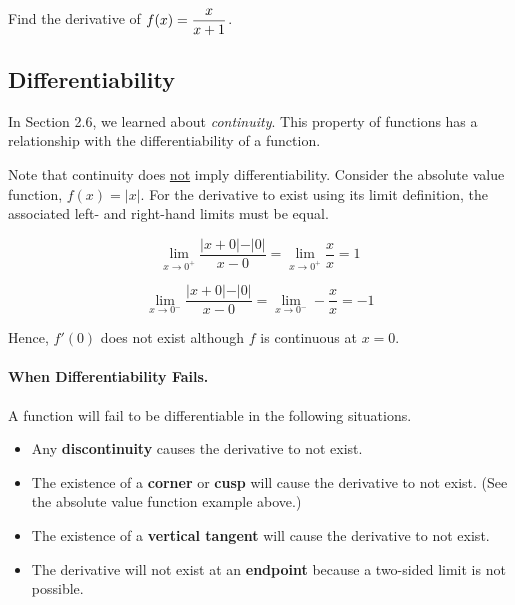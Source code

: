 \documentclass[12pt]{article}
\begin{document}
\newpage

\Example Find the derivative of $f(x)=\displaystyle\frac{x}{x+1}$.

\vspace{50mm}

\subsection*{Differentiability}

In Section 2.6, we learned about \textit{continuity}. This property of functions has a relationship with the differentiability of a function.

\vspace{5mm}


\vspace{5mm}

Note that continuity does \underline{not} imply differentiability. Consider the absolute value function, $f(x)=\vert x \vert$. For the derivative to exist using its limit definition, the associated left- and right-hand limits must be equal.

$$\lim_{x\to 0^+}\frac{\vert x+0\vert -\vert 0 \vert}{x-0}=\lim_{x\to 0^+}\frac{x}{x}=1$$

$$\lim_{x\to 0^-}\frac{\vert x+0\vert - \vert 0 \vert}{x-0}=\lim_{x\to 0^-}-\frac{x}{x}=-1$$

\vspace{3mm}

Hence, $f'(0)$ does not exist although $f$ is continuous at $x=0$.

\vspace{3mm}

\paragraph{When Differentiability Fails.} A function will fail to be differentiable in the following situations.
\begin{itemize}
	\item Any \textbf{discontinuity} causes the derivative to not exist.
	\item The existence of a \textbf{corner} or \textbf{cusp} will cause the derivative to not exist. (See the absolute value function example above.)
	\item The existence of a \textbf{vertical tangent} will cause the derivative to not exist.
	\item The derivative will not exist at an \textbf{endpoint} because a two-sided limit is not possible.
\end{itemize}
\end{document}
